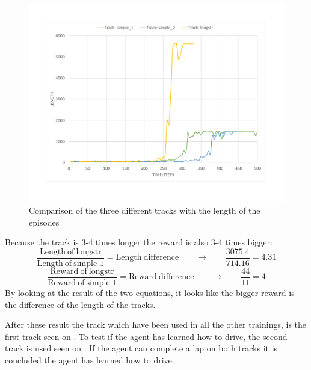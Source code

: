 \begin{figure}[H]
	\centering
	\includegraphics[width=1\textwidth]{Figures/Result/change_of_track_length_graph.pdf}
	\caption{Comparison of the three different tracks with the length of the episodes}
	\label{fig:change_of_track_length_graph}
\end{figure}

Because the track is 3-4 times longer the reward is also 3-4 times bigger:
\begin{equation}
\frac{\mathrm{Length \ of \ longstr}}{\mathrm{Length \ of \ simple\_1}} = \mathrm{Length \ difference}   \qquad \rightarrow \qquad \frac{3075.4}{714.16} = 4.31  
\end{equation}
\begin{equation}
\frac{\mathrm{Reward \ of \ longstr}}{\mathrm{Reward \ of \ simple\_1}} = \mathrm{Reward \ difference}   \qquad \rightarrow \qquad \frac{44}{11} = 4
\end{equation}
By looking at the result of the two equations, it looks like the bigger reward is the difference of the length of the tracks. 

After these result the track which have been used in all the other trainings, is the first track seen on . To test if the agent has learned how to drive, the second track is used seen on . If the agent can complete a lap on both tracks it is concluded the agent has learned how to drive.    



